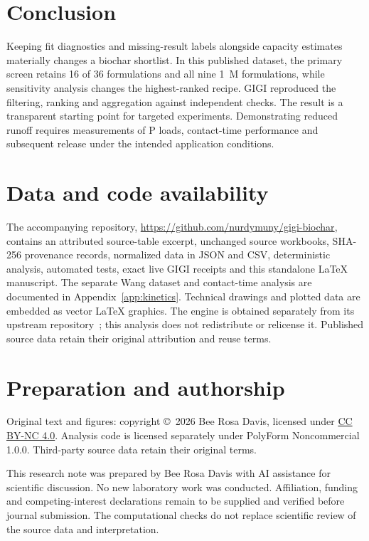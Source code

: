 \documentclass[11pt,letterpaper]{article}
\begin{document}
\section{Conclusion}
Keeping fit diagnostics and missing-result labels alongside capacity estimates materially changes a biochar shortlist. In this published dataset, the primary screen retains 16 of 36 formulations and all nine 1~M formulations, while sensitivity analysis changes the highest-ranked recipe. GIGI reproduced the filtering, ranking and aggregation against independent checks. The result is a transparent starting point for targeted experiments. Demonstrating reduced runoff requires measurements of P loads, contact-time performance and subsequent release under the intended application conditions.

\section*{Data and code availability}
The accompanying repository, \url{https://github.com/nurdymuny/gigi-biochar}, contains an attributed source-table excerpt, unchanged source workbooks, SHA-256 provenance records, normalized data in JSON and CSV, deterministic analysis, automated tests, exact live GIGI receipts and this standalone LaTeX manuscript. The separate Wang dataset and contact-time analysis are documented in Appendix~\ref{app:kinetics}. Technical drawings and plotted data are embedded as vector LaTeX graphics. The engine is obtained separately from its upstream repository~\cite{gigi}; this analysis does not redistribute or relicense it. Published source data retain their original attribution and reuse terms.

\section*{Preparation and authorship}
Original text and figures: copyright \copyright~2026 Bee Rosa Davis, licensed under \href{https://creativecommons.org/licenses/by-nc/4.0/}{CC BY-NC 4.0}. Analysis code is licensed separately under PolyForm Noncommercial 1.0.0. Third-party source data retain their original terms.

This research note was prepared by Bee Rosa Davis with AI assistance for scientific discussion. No new laboratory work was conducted. Affiliation, funding and competing-interest declarations remain to be supplied and verified before journal submission. The computational checks do not replace scientific review of the source data and interpretation.
\end{document}
